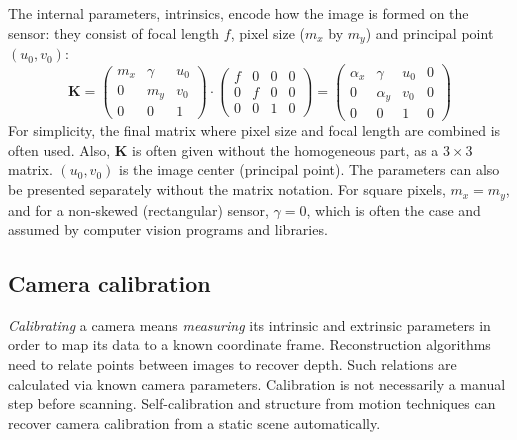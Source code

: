 The internal parameters, intrinsics, encode how the image is formed on the sensor: they consist of focal length $f$, pixel size ($m_x$ by $m_y$) and principal point $(u_0, v_0)$:
\begin{equation}
	\bm K =
	\begin{pmatrix}
		m_x & \gamma & u_0\\
		0   &    m_y & v_0\\
		0   &        0 & 1
	\end{pmatrix}
\cdot
	\begin{pmatrix}
		f & 0 & 0 & 0\\
		0 & f & 0 & 0\\
		0 & 0 & 1 & 0
	\end{pmatrix}
	=
	\begin{pmatrix}
		\alpha_x & \gamma   & u_0 & 0\\
		0        & \alpha_y & v_0 & 0\\
		0        & 0        & 1 & 0
	\end{pmatrix}
\end{equation}
For simplicity, the final matrix where pixel size and focal length are combined is often used.
Also, $\bm K$ is often given without the homogeneous part, as a $3 \times 3$ matrix.
$(u_0, v_0)$ is the image center (principal point).
The parameters can also be presented separately without the matrix notation.
For square pixels, $m_x = m_y$, and for a non-skewed (rectangular) sensor, $\gamma = 0$, which is often the case and assumed by computer vision programs and libraries. \cite{hartley03multiview,szeliski10vision,heyden2005multiple}



\subsection{Camera calibration} %

\emph{Calibrating} a camera means \emph{measuring} its intrinsic and extrinsic parameters in order to map its data to a known coordinate frame.
Reconstruction algorithms need to relate points between images to recover depth.
Such relations are calculated via known camera parameters.
Calibration is not necessarily a manual step before scanning.
Self-calibration and structure from motion techniques can recover camera calibration from a static scene automatically. \cite{pollefeys1999hand,hartley03multiview}

